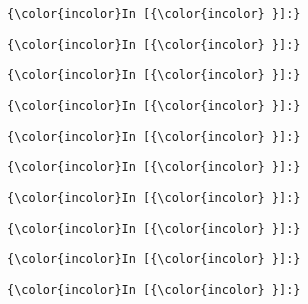 \documentclass[11pt]{article}
\begin{document}
    

    \begin{Verbatim}[commandchars=\\\{\}]
{\color{incolor}In [{\color{incolor} }]:} 
\end{Verbatim}

    \begin{Verbatim}[commandchars=\\\{\}]
{\color{incolor}In [{\color{incolor} }]:} 
\end{Verbatim}

    \begin{Verbatim}[commandchars=\\\{\}]
{\color{incolor}In [{\color{incolor} }]:} 
\end{Verbatim}

    \begin{Verbatim}[commandchars=\\\{\}]
{\color{incolor}In [{\color{incolor} }]:} 
\end{Verbatim}

    \begin{Verbatim}[commandchars=\\\{\}]
{\color{incolor}In [{\color{incolor} }]:} 
\end{Verbatim}

    \begin{Verbatim}[commandchars=\\\{\}]
{\color{incolor}In [{\color{incolor} }]:} 
\end{Verbatim}

    \begin{Verbatim}[commandchars=\\\{\}]
{\color{incolor}In [{\color{incolor} }]:} 
\end{Verbatim}

    \begin{Verbatim}[commandchars=\\\{\}]
{\color{incolor}In [{\color{incolor} }]:} 
\end{Verbatim}

    \begin{Verbatim}[commandchars=\\\{\}]
{\color{incolor}In [{\color{incolor} }]:} 
\end{Verbatim}

    \begin{Verbatim}[commandchars=\\\{\}]
{\color{incolor}In [{\color{incolor} }]:} 
\end{Verbatim}
\end{document}
